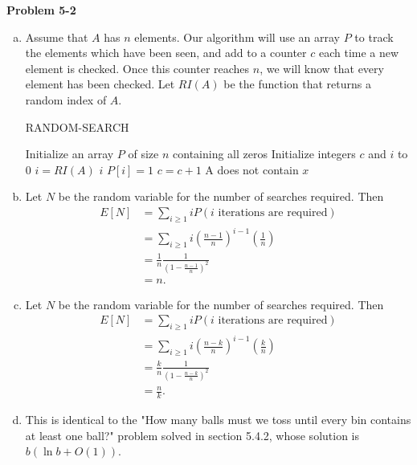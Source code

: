 \documentclass{article}
\begin{document}
\noindent\textbf{Problem 5-2}\\
\begin{enumerate}[a.]
\item Assume that $A$ has $n$ elements.  Our algorithm will use an array $P$ to track the elements which have been seen, and add to a counter $c$ each time a new element is checked.  Once this counter reaches $n$, we will know that every element has been checked.  Let $RI(A)$ be the function that returns a random index of $A$.
\begin{algorithm}
\caption{RANDOM-SEARCH}
\begin{algorithmic}
\State Initialize an array $P$ of size $n$ containing all zeros 
\State Initialize integers $c$ and $i$ to $0$
	\State $i = RI(A)$
		\State \Return $i$
	\EndIf
		\State $P[i] = 1$
		\State $c = c+1$
	\EndIf
\EndWhile
\State \Return A does not contain $x$
\end{algorithmic}
\end{algorithm}

\item Let $N$ be the random variable for the number of searches required.  Then
\begin{align*}
 E[N] &= \sum_{i\geq 1} iP(i \mbox{ iterations are required}) \\
&= \sum_{i\geq 1} i \left(\frac{n-1}{n}\right)^{i-1}\left(\frac{1}{n}\right) \\
&=\frac{1}{n} \frac{1}{\left(1 - \frac{n-1}{n}\right)^2} \\
&= n.
\end{align*}

\item  Let $N$ be the random variable for the number of searches required.  Then
\begin{align*}
 E[N] &= \sum_{i\geq 1} iP(i \mbox{ iterations are required}) \\
&= \sum_{i\geq 1} i \left(\frac{n-k}{n}\right)^{i-1}\left(\frac{k}{n}\right) \\
&=\frac{k}{n} \frac{1}{\left(1 - \frac{n-k}{n}\right)^2} \\
&= \frac{n}{k}.
\end{align*}

\item This is identical to the "How many balls must we toss until every bin contains at least one ball?" problem solved in section 5.4.2, whose solution is $b(\ln b + O(1))$.\\


\end{enumerate}
\end{document}
